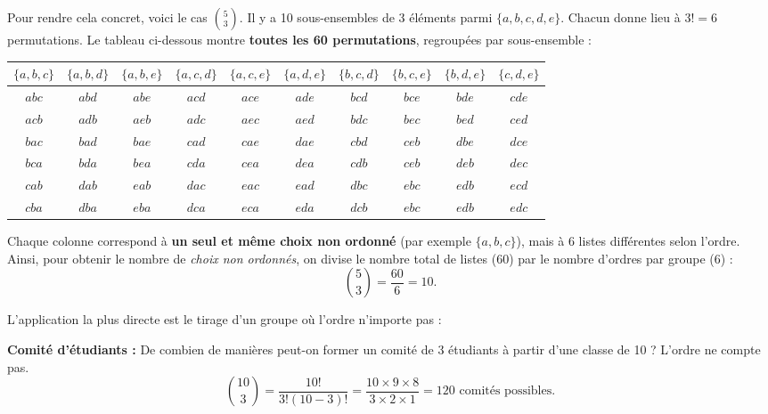 \begin{intuitionbox}
Pour rendre cela concret, voici le cas $\binom{5}{3}$.  
Il y a 10 sous-ensembles de 3 éléments parmi $\{a,b,c,d,e\}$. Chacun donne lieu à $3! = 6$ permutations.  
Le tableau ci-dessous montre \textbf{toutes les 60 permutations}, regroupées par sous-ensemble :

\vspace{3mm}

\begin{center}
\small
\renewcommand{\arraystretch}{0.9}
\setlength{\tabcolsep}{2pt}
\begin{tabular}{|c|c|c|c|c|c|c|c|c|c|}
\hline
\textbf{$\{a,b,c\}$} & \textbf{$\{a,b,d\}$} & \textbf{$\{a,b,e\}$} & \textbf{$\{a,c,d\}$} & \textbf{$\{a,c,e\}$} & \textbf{$\{a,d,e\}$} & \textbf{$\{b,c,d\}$} & \textbf{$\{b,c,e\}$} & \textbf{$\{b,d,e\}$} & \textbf{$\{c,d,e\}$} \\
\hline
$abc$ & $abd$ & $abe$ & $acd$ & $ace$ & $ade$ & $bcd$ & $bce$ & $bde$ & $cde$ \\
\hline
$acb$ & $adb$ & $aeb$ & $adc$ & $aec$ & $aed$ & $bdc$ & $bec$ & $bed$ & $ced$ \\
\hline
$bac$ & $bad$ & $bae$ & $cad$ & $cae$ & $dae$ & $cbd$ & $ceb$ & $dbe$ & $dce$ \\
\hline
$bca$ & $bda$ & $bea$ & $cda$ & $cea$ & $dea$ & $cdb$ & $ceb$ & $deb$ & $dec$ \\
\hline
$cab$ & $dab$ & $eab$ & $dac$ & $eac$ & $ead$ & $dbc$ & $ebc$ & $edb$ & $ecd$ \\
\hline
$cba$ & $dba$ & $eba$ & $dca$ & $eca$ & $eda$ & $dcb$ & $ebc$ & $edb$ & $edc$ \\
\hline
\end{tabular}
\end{center}

\vspace{3mm}

\smallskip

Chaque colonne correspond à \textbf{un seul et même choix non ordonné} (par exemple $\{a,b,c\}$), mais à 6 listes différentes selon l’ordre.  
Ainsi, pour obtenir le nombre de \textit{choix non ordonnés}, on divise le nombre total de listes ($60$) par le nombre d’ordres par groupe ($6$) :
\[
\binom{5}{3} = \frac{60}{6} = 10.
\]
\end{intuitionbox}

L'application la plus directe est le tirage d'un groupe où l'ordre n'importe pas :

\begin{examplebox}
    \textbf{Comité d'étudiants :} De combien de manières peut-on former un comité de 3 étudiants à partir d'une classe de 10 ? L'ordre ne compte pas.
    $$ \binom{10}{3} = \frac{10!}{3!(10-3)!} = \frac{10 \times 9 \times 8}{3 \times 2 \times 1} = 120 \text{ comités possibles.} $$
\end{examplebox}

